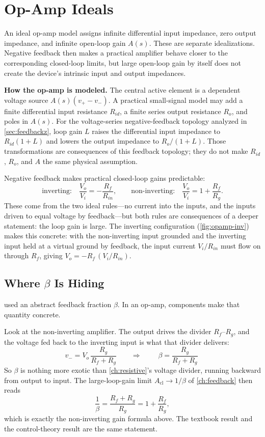 \section{Op-Amp Ideals}
An ideal op-amp model assigns infinite differential input impedance, zero output
impedance, and infinite open-loop gain \(A(s)\). These are separate idealizations.
Negative feedback then makes a practical amplifier behave closer to the corresponding
closed-loop limits, but large open-loop gain by itself does not create the device's
intrinsic input and output impedances.

\begin{physicalbox}
\textbf{How the op-amp is modeled.} The central active element is a dependent voltage
source \(A(s)(v_+-v_-)\). A practical small-signal model may add a finite
differential input resistance \(R_{id}\), a finite series output resistance \(R_o\),
and poles in \(A(s)\). For the voltage-series negative-feedback topology analyzed in
\cref{sec:feedbackz}, loop gain \(L\) raises the differential input impedance to
\(R_{id}(1+L)\) and lowers the output impedance to \(R_o/(1+L)\). Those
transformations are consequences of this feedback topology; they do not make
\(R_{id}\), \(R_o\), and \(A\) the same physical assumption.
\end{physicalbox}

Negative feedback makes practical closed-loop gains predictable:
\[
\text{inverting:}\quad \frac{V_o}{V_i}=-\frac{R_f}{R_{in}},
\qquad
\text{non-inverting:}\quad \frac{V_o}{V_i}=1+\frac{R_f}{R_g}.
\]
These come from the two ideal rules---no current into the inputs, and the inputs
driven to equal voltage by feedback---but both rules are consequences of a deeper
statement: the loop gain is large. The inverting configuration
(\cref{fig:opamp-inv}) makes this concrete: with the non-inverting input grounded
and the inverting input held at a virtual ground by feedback, the input current
\(V_i/R_{in}\) must flow on through \(R_f\), giving \(V_o=-R_f\,(V_i/R_{in})\).

\subsection{Where \texorpdfstring{\(\beta\)}{beta} Is Hiding}
\label{sec:beta-resistors}
 used an abstract feedback fraction \(\beta\). In an op-amp,
components make that quantity concrete.

Look at the non-inverting amplifier. The output drives the divider \(R_f\)--\(R_g\),
and the voltage fed back to the inverting input is what that divider delivers:
\[
v_-=V_o\,\frac{R_g}{R_f+R_g}
\qquad\Longrightarrow\qquad
\boxed{\;\beta=\frac{R_g}{R_f+R_g}\;}
\]
So \(\beta\) is nothing more exotic than \cref{ch:resistive}'s voltage divider,
running backward from output to input. The large-loop-gain limit
\(A_{\mathrm{cl}}\to1/\beta\) of \cref{ch:feedback} then reads
\[
\frac{1}{\beta}=\frac{R_f+R_g}{R_g}=1+\frac{R_f}{R_g},
\]
which is exactly the non-inverting gain formula above. The textbook result and the
control-theory result are the same statement.

